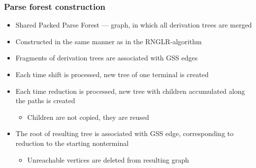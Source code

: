 \documentclass{beamer}
\begin{document}
\begin{frame}
  \transwipe[direction=90]
  \frametitle{Parse forest construction}
  \begin{itemize}
    \item Shared Packed Parse Forest --- graph, in which all derivation trees are merged
    \item Constructed in the same manner as in the RNGLR-algorithm
    \end{itemize}
    \begin{itemize}
      \item Fragments of derivation trees are associated with GSS edges
      \item Each time shift is processed, new tree of one terminal is created
      \item Each time reduction is processed, new tree with children accumulated along the paths is created
      \begin{itemize}
        \item Children are not copied, they are reused        
      \end{itemize}
      \item The root of resulting tree is associated with GSS edge, corresponding to reduction to the starting nonterminal
      \begin{itemize}
        \item Unreachable vertices are deleted from resulting graph
      \end{itemize}
    \end{itemize}

\end{frame}
\end{document}
